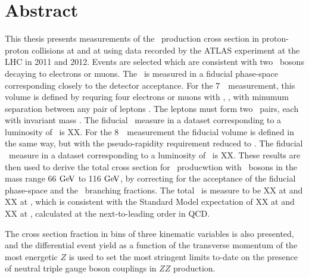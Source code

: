 \chapter*{Abstract}
This thesis presents measurements of the \ZZ\ production cross section in proton-proton collisions
at  and at  using data recorded by the ATLAS experiment 
at the LHC in 2011 and 2012.  
Events are selected which are consistent with two \Z\ bosons decaying to
electrons or muons. The \cx\ is measured in a fiducial phase-space corresponding
closely to the detector acceptance. For the 7~\tev\ measurement, this volume is
defined by requring four electrons or muons with , ,
with minumum separation between any pair of leptons . The leptons
must form two \ossf\ pairs, each with invariant mass \sstooos. The fiducial \cx\
measure in a dataset corresponding to a luminosity of
\LumiPassGRLTwentyEleven\ifb\ is XX. For the 8~\tev\ measurement the fiducial
volume is defined in the same way, but with the pseudo-rapidity requirement
reduced to \modetalt{2.7}. The fiducial \cx\
measure in a dataset corresponding to a luminosity of
\LumiPassGRLTwentyTwelve\ifb\ is XX.
These results are then used to derive the total cross section for \ZZ\
producwtion with \Z\ bosons in the mass range 66$\GeV$ to 116$\GeV$, by
correcting for the acceptance of the fiducial phase-space and the \Zll\
branching fractions. The total \cx\ is measure to be XX at  and XX at
\sqrtseq{8}, which is consistent with the Standard Model
expectation of XX at \sqrtseq{7} and XX at
\sqrtseq{8}, calculated at the next-to-leading order in QCD.

The cross section fraction in bins of three kinematic variables is also presented, and 
the differential event yield as a function of the transverse momentum of the most energetic $Z$ 
is used to set the most stringent limits to-date on the presence of 
neutral triple gauge boson couplings in $ZZ$ production.
